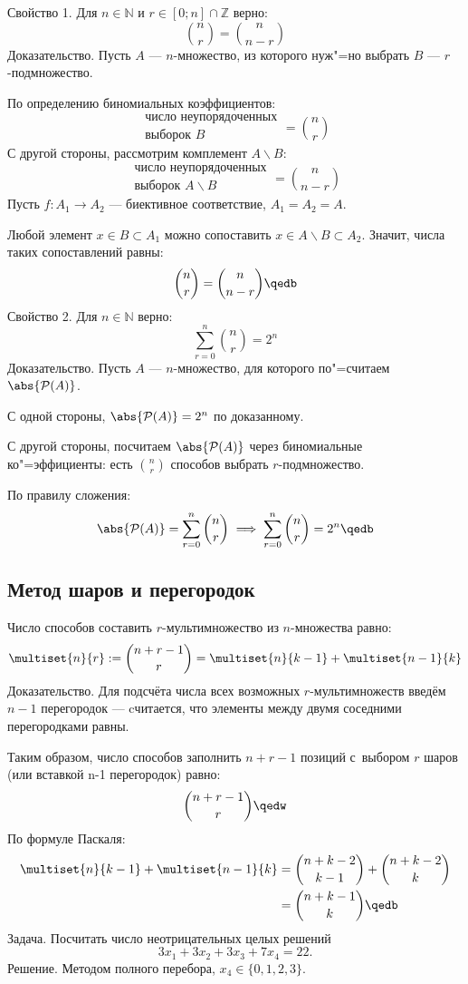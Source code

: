 {\bold Свойство 1.} Для $n\in\mathbb{N}$ и $r\in[0;n]\cap\mathbb{Z}$ верно:
$$\binom{n}{r}=\binom{n}{n-r}$$
{\bold Доказательство.} Пусть $A$ --- $n$-множество, из которого нуж"=но выбрать $B$ --- $r$-подмножество.

По определению биномиальных коэффициентов:
$$\substack{\text{число неупорядоченных}\\\text{выборок }B}=\binom{n}{r}$$
С другой стороны, рассмотрим комплемент $A\backslash B$:
$$\substack{\text{число неупорядоченных}\\\text{выборок }A\backslash B}=\binom{n}{n-r}$$
Пусть $f\colon A_1\to A_2$ --- биективное соответствие, $A_1=A_2=A$.

Любой элемент $x\in B\subset A_1$ можно сопоставить $x\in A\backslash B\subset A_2$. Значит, числа таких сопоставлений равны:
$$\binom{n}{r}=\binom{n}{n-r}\qedb$$
{\bold Свойство 2.} Для $n\in\mathbb{N}$ верно:
$$\sum_{r=0}^n\binom{n}{r}=2^n$$
{\bold Доказательство.} Пусть $A$ --- $n$-множество, для которого по"=считаем $\abs{\mathcal{P}(A)}$.

С одной стороны, $\abs{\mathcal{P}(A)}=2^n$ по доказанному.

С другой стороны, посчитаем $\abs{\mathcal{P}(A)}$ через биномиальные ко"=эффициенты: есть $\binom{n}{r}$ способов выбрать $r$-подмножество.

По правилу сложения:
$$\abs{\mathcal{P}(A)}=\sum_{r=0}^n\binom{n}{r}\implies\sum_{r=0}^n\binom{n}{r}=2^n\qedb$$

\subsection{Метод шаров и перегородок}

Число способов составить $r$-мультимножество из $n$-множества равно:
$$\multiset{n}{r}:=\binom{n+r-1}{r}=\multiset{n}{k-1}+\multiset{n-1}{k}$$
{\bold Доказательство.} Для подсчёта числа всех возможных $r$-мультимножеств введём $n-1$ {\ital перегородок} --- cчитается, что элементы между двумя соседними перегородками равны.

Таким образом, число способов заполнить $n+r-1$ позиций с~выбором $r$ шаров {\ital\color{desc}(или вставкой n-1 перегородок)} равно:
$$\binom{n+r-1}{r}\qedw$$
По формуле Паскаля:
\begin{align*}
\multiset{n}{k-1}+\multiset{n-1}{k}&=\binom{n+k-2}{k-1}+\binom{n+k-2}{k}\\
&=\binom{n+k-1}{k}\qedb
\end{align*}
{\bold Задача.} Посчитать число неотрицательных целых решений
$$3x_1+3x_2+3x_3+7x_4=22.$$
{\bold Решение.} Методом полного перебора, $x_4\in\{0,1,2,3\}$.

